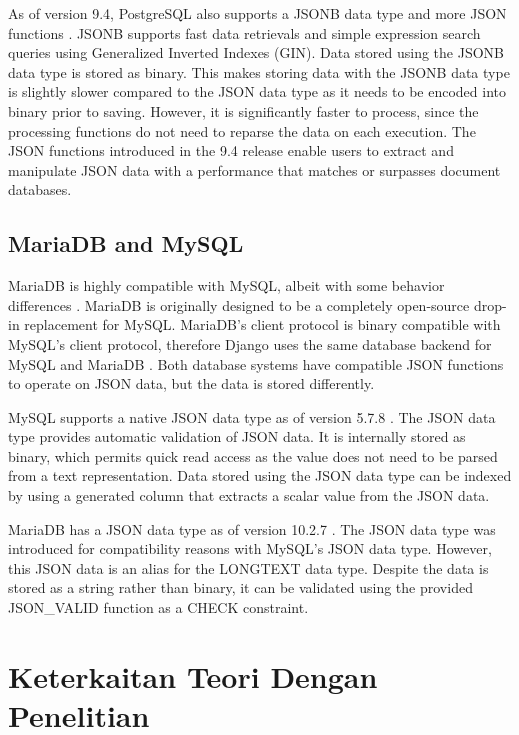 As of version 9.4, PostgreSQL also supports a JSONB data type and more JSON
functions \cite{postgresql:9.4}. JSONB supports fast data retrievals and simple
expression search queries using Generalized Inverted Indexes (GIN). Data stored
using the JSONB data type is stored as binary. This makes storing data with the
JSONB data type is slightly slower compared to the JSON data type as it needs
to be encoded into binary prior to saving. However, it is significantly faster
to process, since the processing functions do not need to reparse the data on
each execution. The JSON functions introduced in the 9.4 release enable users
to extract and manipulate JSON data with a performance that matches or
surpasses document databases.

\subsection{MariaDB and MySQL}

MariaDB is highly compatible with MySQL, albeit with some behavior differences
\cite{mariadb:compatibility}. MariaDB is originally designed to be a completely
open-source drop-in replacement for MySQL. MariaDB's client protocol is binary
compatible with MySQL's client protocol, therefore Django uses the same
database backend for MySQL and MariaDB \cite{django:databases}. Both database
systems have compatible JSON functions to operate on JSON data, but the data
is stored differently.

MySQL supports a native JSON data type as of version 5.7.8 \cite{mysql:json}.
The JSON data type provides automatic validation of JSON data. It is internally
stored as binary, which permits quick read access as the value does not need to
be parsed from a text representation. Data stored using the JSON data type can
be indexed by using a generated column that extracts a scalar value from the
JSON data.

MariaDB has a JSON data type as of version 10.2.7 \cite{mariadb:json}. The JSON
data type was introduced for compatibility reasons with MySQL's JSON data type.
However, this JSON data is an alias for the LONGTEXT data type. Despite the
data is stored as a string rather than binary, it can be validated using the
provided JSON\_VALID function as a CHECK constraint.

\section{Keterkaitan Teori Dengan Penelitian}

